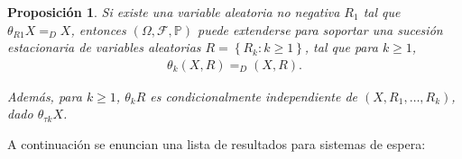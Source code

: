 \documentclass{article}
\newtheorem{Prop}{Proposición}[section]
\newcommand{\prob}{\mathbb{P}}
\numberwithin{equation}{section}
\begin{document}
\begin{Prop}
Si existe una variable aleatoria no negativa $R_{1}$ tal que $\theta_{R1}X=_{D}X$, entonces $\left(\Omega,\mathcal{F},\prob\right)$ puede extenderse para soportar una sucesi\'on estacionaria de variables aleatorias $R=\left\{R_{k}:k\geq1\right\}$, tal que para $k\geq1$,
\begin{eqnarray*}
\theta_{k}\left(X,R\right)=_{D}\left(X,R\right).
\end{eqnarray*}

Adem\'as, para $k\geq1$, $\theta_{k}R$ es condicionalmente independiente de $\left(X,R_{1},\ldots,R_{k}\right)$, dado $\theta_{\tau k}X$.

\end{Prop}

A continuaci\'on se enuncian una lista de resultados para sistemas de espera:
\end{document}
